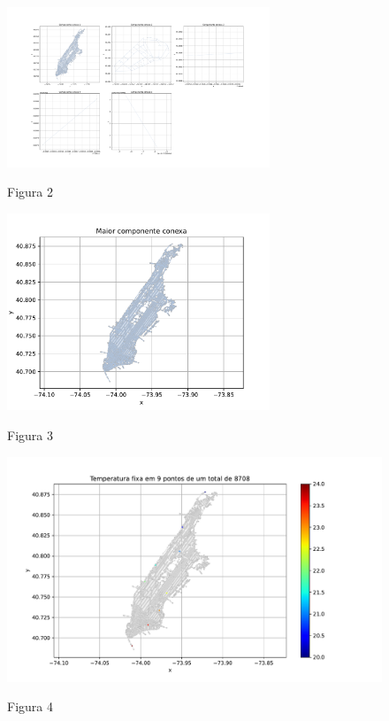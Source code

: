 \documentclass{article}
\begin{document}
    \newpage

    \begin{figure}[ht]
        \centering
        \includegraphics[width=0.7\textwidth, trim={5.4cm 2.3cm 5.4cm 3.7cm},clip]{../figs/fig2.pdf}
        
        Figura 2
    \end{figure}

    \vspace{2cm}

    \begin{figure}[ht]
        \centering
        \includegraphics[width=0.7\textwidth, trim={5px 10px 15px 25px},clip]{../figs/fig3.pdf}
        
        Figura 3
    \end{figure}

    \newpage

    \phantom{}

    \vspace{3cm}

    \begin{figure}[ht]
        \centering
        \includegraphics[width=1\textwidth, trim={5px 10px 55px 25px},clip]{../figs/fig4.pdf}
        
        \LARGE{Figura 4}
    \end{figure}
\end{document}

